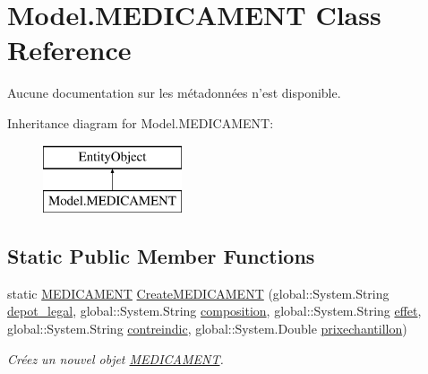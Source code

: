 \hypertarget{class_model_1_1_m_e_d_i_c_a_m_e_n_t}{\section{Model.\-M\-E\-D\-I\-C\-A\-M\-E\-N\-T Class Reference}
\label{class_model_1_1_m_e_d_i_c_a_m_e_n_t}
}


Aucune documentation sur les métadonnées n'est disponible.  


Inheritance diagram for Model.\-M\-E\-D\-I\-C\-A\-M\-E\-N\-T\-:\begin{figure}[H]
\begin{center}
\leavevmode
\includegraphics[height=2.000000cm]{class_model_1_1_m_e_d_i_c_a_m_e_n_t}
\end{center}
\end{figure}
\subsection*{Static Public Member Functions}
\begin{DoxyCompactItemize}
\item 
static \hyperlink{class_model_1_1_m_e_d_i_c_a_m_e_n_t}{M\-E\-D\-I\-C\-A\-M\-E\-N\-T} \hyperlink{class_model_1_1_m_e_d_i_c_a_m_e_n_t_a2ca33d05a3c0fb7b7801bf9337b2e511}{Create\-M\-E\-D\-I\-C\-A\-M\-E\-N\-T} (global\-::\-System.\-String \hyperlink{class_model_1_1_m_e_d_i_c_a_m_e_n_t_ad27c0736a77e2ac61cf5d94d7f0ddd00}{depot\-\_\-legal}, global\-::\-System.\-String \hyperlink{class_model_1_1_m_e_d_i_c_a_m_e_n_t_af047e823d0f57ffd36009d48ddae4a9c}{composition}, global\-::\-System.\-String \hyperlink{class_model_1_1_m_e_d_i_c_a_m_e_n_t_ad94a543654340fa8b32a0f82996fb95b}{effet}, global\-::\-System.\-String \hyperlink{class_model_1_1_m_e_d_i_c_a_m_e_n_t_adfdf391b99b65867478accf4a5bb6453}{contreindic}, global\-::\-System.\-Double \hyperlink{class_model_1_1_m_e_d_i_c_a_m_e_n_t_a58b900226ac1992ee6b3f996c667e51a}{prixechantillon})
\begin{DoxyCompactList}\small\item\em Créez un nouvel objet \hyperlink{class_model_1_1_m_e_d_i_c_a_m_e_n_t}{M\-E\-D\-I\-C\-A\-M\-E\-N\-T}. \end{DoxyCompactList}\end{DoxyCompactItemize}
